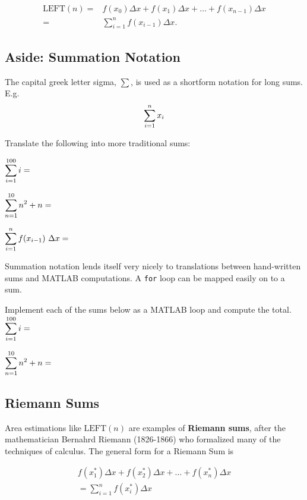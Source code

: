 \begin{align*}
  \mbox{LEFT}(n) = & f(x_{0}) \Delta x+ 
 f(x_{1}) \Delta x + \ldots + 
 f(x_{n-1}) \Delta x 
\\  = & \displaystyle\sum_{i=1}^{n} f(x_{i-1})\Delta x.
\end{align*}

\newpage

\subsection*{Aside: Summation Notation}

The capital greek letter sigma, $\sum$, is used as a shortform notation for long sums.
E.g.
$$\displaystyle \sum_{i=1}^n x_i$$

\newpage
\problem 
Translate the following into more traditional sums:

$\displaystyle \sum_{i=1}^{100} i= $ \vfill 

$\displaystyle \sum_{n=1}^{10} n^2 + n= $  \vfill

$\displaystyle \sum_{i=1}^{n}  f(x_{i-1}) ~\Delta x= $
\vfill

\newpage 

Summation notation lends itself very nicely to translations between
hand-written sums and MATLAB computations.  A \texttt{for} loop can be
mapped easily on to a sum.

\problem Implement each of the sums below as a MATLAB loop and compute
the total. \\

$\displaystyle \sum_{i=1}^{100} i= $ \vfill 

$\displaystyle \sum_{n=1}^{10} n^2 + n= $  \vfill

\newpage


\subsection*{Riemann Sums}

Area estimations like $\mbox{LEFT}(n)$ are examples of {\bf Riemann sums},
after the mathematician Bernahrd Riemann (1826-1866) who formalized
many of the techniques of calculus.  The general form for a Riemann
Sum is

\begin{align*}
 f(x_{1}^{*}) \Delta x+ f(x_{2}^{*}) \Delta x + \ldots + f(x_{n}^{*}) \Delta x 
 \\ = \displaystyle\sum_{i=1}^{n} f(x_{i}^{*})\Delta x
\end{align*}

